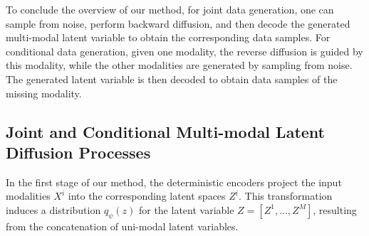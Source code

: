 

To conclude the overview of our method, for joint data generation, one can sample from noise, perform backward diffusion, and then decode the generated multi-modal latent variable to obtain the corresponding data samples. For conditional data generation, given one modality, the reverse diffusion is guided by this modality, while the other modalities are generated by sampling from noise. The generated latent variable is then decoded to obtain data samples of the missing modality.


\subsection{Joint and Conditional Multi-modal Latent Diffusion Processes}\label{sec:mld}
In the first stage of our method, the deterministic encoders project the input modalities $X^i$ into the corresponding latent spaces $Z^i$. This transformation induces a distribution $q_\psi(z)$ for the latent variable $Z=[Z^1,\dots,Z^M]$, resulting from the concatenation of uni-modal latent variables.

